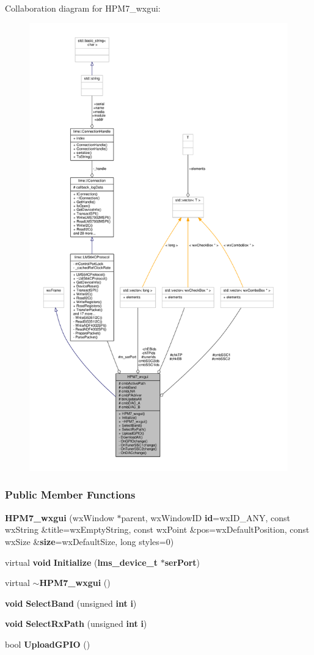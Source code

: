 Collaboration diagram for H\+P\+M7\+\_\+wxgui\+:
\nopagebreak
\begin{figure}[H]
\begin{center}
\leavevmode
\includegraphics[height=550pt]{d2/db8/classHPM7__wxgui__coll__graph}
\end{center}
\end{figure}
\subsubsection*{Public Member Functions}
\begin{DoxyCompactItemize}
\item 
{\bf H\+P\+M7\+\_\+wxgui} (wx\+Window $\ast$parent, wx\+Window\+ID {\bf id}=wx\+I\+D\+\_\+\+A\+NY, const wx\+String \&title=wx\+Empty\+String, const wx\+Point \&pos=wx\+Default\+Position, const wx\+Size \&{\bf size}=wx\+Default\+Size, long styles=0)
\item 
virtual {\bf void} {\bf Initialize} ({\bf lms\+\_\+device\+\_\+t} $\ast${\bf ser\+Port})
\item 
virtual {\bf $\sim$\+H\+P\+M7\+\_\+wxgui} ()
\item 
{\bf void} {\bf Select\+Band} (unsigned {\bf int} {\bf i})
\item 
{\bf void} {\bf Select\+Rx\+Path} (unsigned {\bf int} {\bf i})
\item 
bool {\bf Upload\+G\+P\+IO} ()
\end{DoxyCompactItemize}
